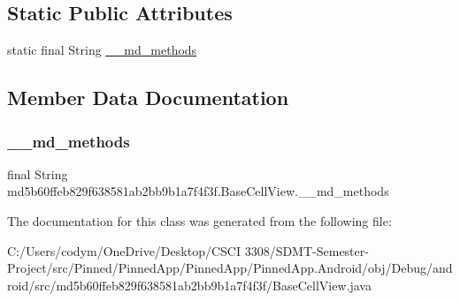 \subsection*{Static Public Attributes}
\begin{DoxyCompactItemize}
\item 
static final String \hyperlink{classmd5b60ffeb829f638581ab2bb9b1a7f4f3f_1_1_base_cell_view_ab45ff8d3fd40dd0e56aafff804b441ea}{\+\_\+\+\_\+md\+\_\+methods}
\end{DoxyCompactItemize}


\subsection{Member Data Documentation}
\mbox{\label{classmd5b60ffeb829f638581ab2bb9b1a7f4f3f_1_1_base_cell_view_ab45ff8d3fd40dd0e56aafff804b441ea}} 
\subsubsection{\texorpdfstring{\+\_\+\+\_\+md\+\_\+methods}{\_\_md\_methods}}
{\footnotesize\ttfamily final String md5b60ffeb829f638581ab2bb9b1a7f4f3f.\+Base\+Cell\+View.\+\_\+\+\_\+md\+\_\+methods\hspace{0.3cm}{\ttfamily [static]}}



The documentation for this class was generated from the following file\+:\begin{DoxyCompactItemize}
\item 
C\+:/\+Users/codym/\+One\+Drive/\+Desktop/\+C\+S\+C\+I 3308/\+S\+D\+M\+T-\/\+Semester-\/\+Project/src/\+Pinned/\+Pinned\+App/\+Pinned\+App/\+Pinned\+App.\+Android/obj/\+Debug/android/src/md5b60ffeb829f638581ab2bb9b1a7f4f3f/Base\+Cell\+View.\+java\end{DoxyCompactItemize}
